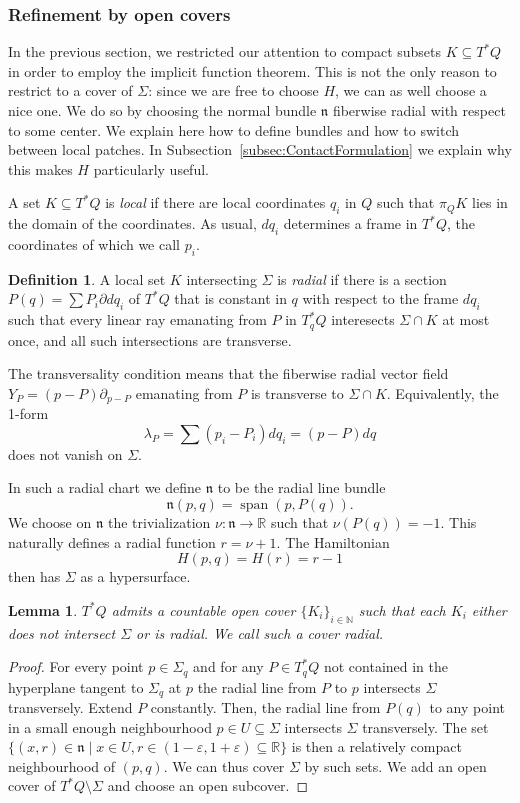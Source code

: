 \documentclass{amsart}
\newcommand{\NN}{\mathbb{N}}
\newcommand{\RR}{\mathbb{R}}
\newtheorem{lemma}[proposition]{Lemma}
\theoremstyle{definition}
\newtheorem{definition}[proposition]{Definition}
\theoremstyle{remark}
\numberwithin{equation}{section}
\begin{document}
\subsubsection{Refinement by open covers}\label{subsubsec:Covers}
In the previous section, we restricted our attention to compact subsets $K\subseteq T^*Q$ in order to employ the implicit function theorem. This is not the only reason to restrict to a cover of $\Sigma$: since we are free to choose $H$, we can as well choose a nice one. We do so by choosing the normal bundle $\mathfrak n$ fiberwise radial with respect to some center. We explain here how to define bundles and how to switch between local patches. In Subsection~\ref{subsec:ContactFormulation} we explain why this makes $H$ particularly useful.

A set $K\subseteq T^*Q$ is \emph{local} if there are local coordinates $q_i$ in $Q$ such that $\pi_QK$ lies in the domain of the coordinates. As usual, $dq_i$ determines a frame in $T^*Q$, the coordinates of which we call $p_i$. 
\begin{definition}
    A local set $K$ intersecting $\Sigma$ is \emph{radial} if there is a section $P(q)=\sum P_i\partial dq_i$ of $T^*Q$ that is constant in $q$ with respect to the frame $dq_i$ such that every linear ray emanating from $P$ in $T^*_qQ$ interesects $\Sigma\cap K$ at most once, and all such intersections are transverse.
\end{definition}
    The transversality condition means that the fiberwise radial vector field $Y_P=(p-P)\partial_{p-P}$ emanating from $P$ is transverse to $\Sigma\cap K$. Equivalently, the 1-form 
    $$\lambda_{P}= \sum(p_i-P_i) dq_i = (p-P) dq$$
    does not vanish on $\Sigma$. 
 
In such a radial chart we define $\mathfrak n$ to be the radial line bundle 
$$\mathfrak n(p,q)= \operatorname{span}(p,P(q)).$$ 
We choose on $\mathfrak n$ the trivialization $\nu:\mathfrak n\to\RR$ such that $\nu(P(q))=-1$. This naturally defines a radial function $r=\nu+1$. The Hamiltonian 
$$H(p,q)=H(r)=r-1$$
then has $\Sigma$ as a hypersurface. 

\begin{lemma}
    $T^*Q$ admits a countable open cover $\{K_i\}_{i\in\NN}$ such that each $K_i$ either does not intersect $\Sigma$ or is radial. We call such a cover radial. 
\end{lemma}
\begin{proof}
    For every point $p\in\Sigma_q$ and for any $P\in T^*_qQ$ not contained in the hyperplane tangent to $\Sigma_q$ at $p$ the radial line from $P$ to $p$ intersects $\Sigma$ transversely. Extend $P$ constantly. Then, the radial line from $P(q)$ to any point in a small enough neighbourhood $p\in U\subseteq \Sigma$ intersects $\Sigma$ transversely. The set $\{(x,r)\in \mathfrak n\mid x\in U, r\in(1-\varepsilon,1+\varepsilon)\subseteq\RR\}$ is then a relatively compact neighbourhood of $(p,q)$. We can thus cover $\Sigma$ by such sets. We add an open cover of $T^*Q\setminus \Sigma$ and choose an open subcover.
\end{proof}
\end{document}
